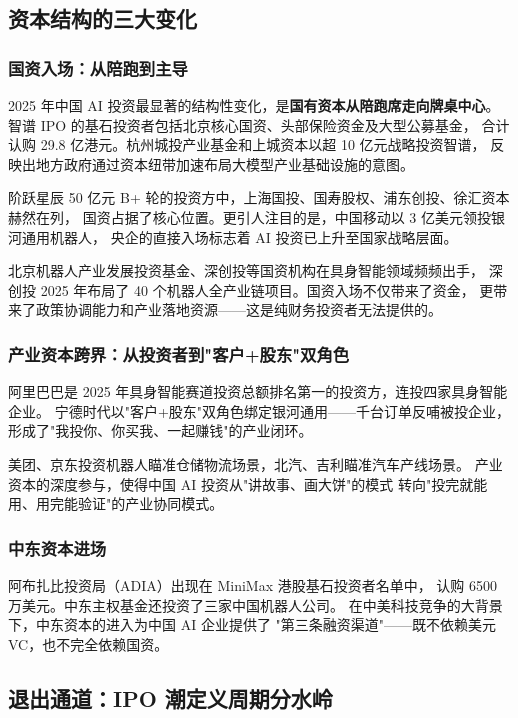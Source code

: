 \subsection{资本结构的三大变化}
\label{subsec:china-capital-shifts}

\subsubsection{国资入场：从陪跑到主导}

2025 年中国 AI 投资最显著的结构性变化，是\textbf{国有资本从陪跑席走向牌桌中心}。
智谱 IPO 的基石投资者包括北京核心国资、头部保险资金及大型公募基金，
合计认购 29.8 亿港元。杭州城投产业基金和上城资本以超 10 亿元战略投资智谱，
反映出地方政府通过资本纽带加速布局大模型产业基础设施的意图。

阶跃星辰 50 亿元 B+ 轮的投资方中，上海国投、国寿股权、浦东创投、徐汇资本赫然在列，
国资占据了核心位置。更引人注目的是，中国移动以 3 亿美元领投银河通用机器人，
央企的直接入场标志着 AI 投资已上升至国家战略层面。

北京机器人产业发展投资基金、深创投等国资机构在具身智能领域频频出手，
深创投 2025 年布局了 40 个机器人全产业链项目。国资入场不仅带来了资金，
更带来了政策协调能力和产业落地资源——这是纯财务投资者无法提供的。

\subsubsection{产业资本跨界：从投资者到"客户+股东"双角色}

阿里巴巴是 2025 年具身智能赛道投资总额排名第一的投资方，连投四家具身智能企业。
宁德时代以"客户+股东"双角色绑定银河通用——千台订单反哺被投企业，
形成了"我投你、你买我、一起赚钱"的产业闭环。

美团、京东投资机器人瞄准仓储物流场景，北汽、吉利瞄准汽车产线场景。
产业资本的深度参与，使得中国 AI 投资从"讲故事、画大饼"的模式
转向"投完就能用、用完能验证"的产业协同模式。

\subsubsection{中东资本进场}

阿布扎比投资局（ADIA）出现在 MiniMax 港股基石投资者名单中，
认购 6500 万美元。中东主权基金还投资了三家中国机器人公司。
在中美科技竞争的大背景下，中东资本的进入为中国 AI 企业提供了
"第三条融资渠道"——既不依赖美元 VC，也不完全依赖国资。

\subsection{退出通道：IPO 潮定义周期分水岭}
\label{subsec:china-exit}

